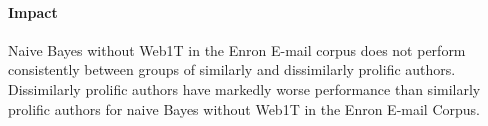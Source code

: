 \paragraph*{Impact} Naive Bayes without Web1T in the Enron E-mail corpus does not perform consistently between groups of similarly and dissimilarly prolific authors.  Dissimilarly prolific authors have markedly worse performance than similarly prolific authors for naive Bayes without Web1T in the Enron E-mail Corpus.
\begin{comment}
\paragraph*{} 
\begin{itemize}
\item Naive Bayes performance, with Web1T\% of 1 or greater, is consistent for similarly and dissimilarly prolific authors in the Enron E-mail Corpus.
\end{itemize}

\paragraph*{Curvature} For Figure \ref{fig:plot-tiled-cdf-summary-nb-enron-GB3-ALL-1} shows three closely grouped curves.  Just like in Figure \ref{fig:plot-tiled-cdf-summary-nb-enron-GB3-ALL-0}, the curvature of all three curves progresses from down and right to more up and left as group size increases.  
\paragraph*{Grouping}The grouping of the three curves becomes closer as group size increases with all three curves merging at a group size of 150. 
\paragraph*{Position} The left/right position for naive Bayes with Web1T\% of 1 is consistent through all group sizes. This shows that increasing group size has less effect on the top and bottom performing authors than on the average performing authors.
\paragraph*{Impact} Naive Bayes using Web1T as a vocabulary performs consistently across similarly and dissimilarly prolific authors with better performance than naive Bayes without Web1T in the Enron E-mail Corpus.
\end{comment}

